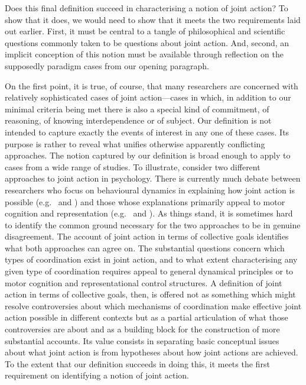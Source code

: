 \documentclass[12pt,a4paper]{extarticle}
\begin{document}
Does this final definition succeed in characterising a notion of joint action?
To show that it does, 
we would need to show that it meets the two requirements laid out earlier.
First, 
it must be central to a tangle of philosophical and scientific questions commonly taken to be questions about joint action.
And, second, 
an implicit conception of this notion must be available through reflection on the supposedly paradigm cases from our opening paragraph.

On the first point,
it is true, of course, that many researchers are concerned with relatively sophisticated cases of joint action---cases in which, in addition to our minimal  criteria being met there is also a special kind of commitment, of reasoning, of knowing  interdependence or of subject.
Our  definition is not intended to capture exactly the events of interest in any one of these cases.
Its purpose is rather to reveal what unifies otherwise apparently conflicting approaches.
The notion captured by our definition is broad enough to apply to cases from a wide range of studies.
To illustrate, consider two different approaches to joint action in psychology.
There is currently much debate between researchers who focus on behavioural dynamics in explaining how joint action is possible
(e.g.\ 
	\citealp{marsh_social_2009} and
	\citealp{schmidt_richardons:_2008}%
)
and those whose explanations primarily appeal to  motor cognition and representation (e.g.\ 
	\citealp{Sebanz:2005fk} and
	\citealp{Knoblich:2006bn}%
).
As things stand, it is sometimes hard to identify the common ground necessary for the two approaches to be in genuine disagreement.
The account of joint action in terms of collective goals identifies what both approaches can agree on. 
The substantial questions concern which types of coordination exist in joint action, 
	and to what extent characterising any given type of coordination requires appeal to general dynamical principles or to motor cognition and representational control structures.
A definition of joint action in terms of collective goals, then, is offered 
	not as 
	something which might resolve controversies about which mechanisms of coordination make effective joint action possible in different contexts
	but as 
	a partial articulation of what those controversies are about
	and as
	a building block for the construction of more substantial accounts.
Its value consists in separating basic conceptual issues about  what joint action is from hypotheses about how joint actions are achieved.
To the extent that our definition succeeds in doing this, it meets the first requirement on identifying a notion of joint action.
	
\end{document}
